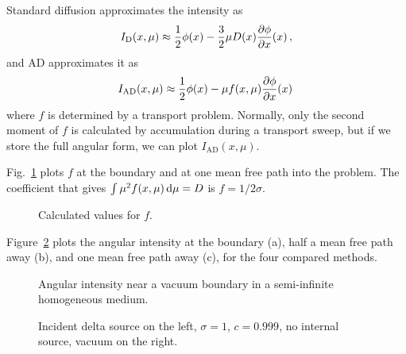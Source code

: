 Standard diffusion approximates the intensity as
\begin{equation*}
  I_\mathrm{D}(x, \mu) \approx \frac{1}{2} \phi(x) - \frac{3}{2} \mu D(x) \frac{\partial \phi}{\partial x}(x)\,,
\end{equation*}
and AD approximates it as
\begin{equation*}
  I_\mathrm{AD}(x, \mu) \approx \frac{1}{2} \phi(x) - \mu f(x, \mu)
  \frac{\partial \phi}{\partial x}(x)\,
\end{equation*}
where $f$ is determined by a transport problem. Normally, only the second
moment of $f$ is calculated by accumulation during a transport sweep, but if we
store the full angular form, we can plot $I_\mathrm{AD}(x, \mu)$.

Fig.~\ref{fig:bndycondAdfOut} plots $f$ at the boundary and at one mean free
path into the problem. The coefficient that gives $\int \mu^2 f(x,\mu) \mathop{}\!\mathrm{d} \mu
=D $ is $f=1/2\sigma$.

\begin{figure}[htb]
  \centering
  \hspace{-.6in}
  \subfigure[$x=0.00125$]{
  
  }
  \hspace{-.2in}
  \subfigure[$x=1$]{
  
  }
  \hspace{-.6in}
  \caption{Calculated values for $f$.}
  \label{fig:bndycondAdfOut}
\end{figure}

Figure~\ref{fig:bndycondAngularIntensity} plots the angular intensity at the
boundary (a), half a mean free path away (b), and one mean free path away (c),
for the four compared methods. 
\begin{figure}[htb]
  \centering
  \hspace{-.6in}
  \subfigure[$x=0.00125$]{
  
  }
  \hspace{-.2in}
  \subfigure[$x=0.5$]{
  
  }
  \hspace{-.6in}

  \subfigure[$x=1$]{
  
  }
  \caption{Angular intensity near a vacuum boundary in a semi-infinite
  homogeneous medium.}
  \label{fig:bndycondAngularIntensity}
\end{figure}


\clearpage
\begin{figure}[htb]
  \centering
  \hspace{-.6in}
  \hspace{-.2in}
  \hspace{-.6in}
  \caption{Incident delta source on the left, $\sigma=1$,
  $c=0.999$, no internal source, vacuum on the right.}
  \label{fig:bndycondSolutions}
\end{figure}

